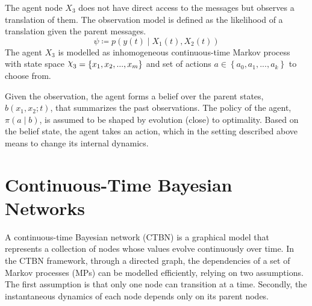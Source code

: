 The agent node $ X_3 $ does not have direct access to the messages but observes a translation of them. The observation model is defined as the likelihood of a translation given the parent messages.
\begin{equation}
\psi \coloneqq p(y(t) \mid X_{1}(t), X_{2}(t))
\end{equation}
The agent  $ X_{3} $ is modelled as inhomogeneous continuous-time Markov process with state space $ \rchi_{3} = \left\lbrace x_{1}, x_{2}, ..., x_{m} \right\rbrace  $ and set of actions $ a \in \left\lbrace a_{0}, a_{1}, ..., a_{k}\right\rbrace  $ to choose from. 

Given the observation, the agent forms a belief over the parent states, $  b(x_{1}, x_{2}; t) $, that summarizes the past observations. The policy of the agent, $ \pi(a \mid b) $, is assumed to be shaped by evolution (close) to optimality. Based on the belief state, the agent takes an action, which in the setting described above means to change its internal dynamics. 
\section{Continuous-Time Bayesian Networks}
A continuous-time Bayesian network (CTBN) is a graphical model that represents a collection of nodes whose values evolve continuously over time. In the CTBN framework, through a directed graph, the dependencies of a set of Markov processes (MPs) can be modelled efficiently, relying on two assumptions. The first assumption is that only one node can transition at a time. Secondly, the instantaneous dynamics of each node depends only on its parent nodes. \cite{Cohn2010a, Nodelman1995} 
